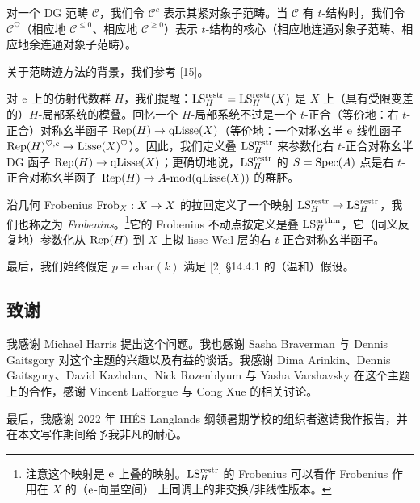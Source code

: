 对一个 DG 范畴 $\mathcal{C}$，我们令 $\mathcal{C}^c$ 表示其紧对象子范畴。当 $\mathcal{C}$ 有 $t$-结构时，我们令 $\mathcal{C}^\heartsuit$（相应地 $\mathcal{C}^{\leq 0}$、相应地 $\mathcal{C}^{\geq 0}$）表示 $t$-结构的核心（相应地连通对象子范畴、相应地余连通对象子范畴）。

关于范畴迹方法的背景，我们参考 [15]。

对 $\mathrm{e}$ 上的仿射代数群 $H$，我们提醒：$\mathrm{LS}^{\mathrm{restr}}_H = \mathrm{LS}^{\mathrm{restr}}_H(X)$ 是 $X$ 上（具有受限变差的）$H$-局部系统的模叠。回忆一个 $H$-局部系统不过是一个 $t$-正合（等价地：右 $t$-正合）对称幺半函子 $\mathrm{Rep}(H) \to \mathrm{qLisse}(X)$（等价地：一个对称幺半 $\mathrm{e}$-线性函子 $\mathrm{Rep}(H)^{\heartsuit,c} \to \mathrm{Lisse}(X)^{\heartsuit}$）。因此，我们定义叠 $\mathrm{LS}^{\mathrm{restr}}_H$ 来参数化右 $t$-正合对称幺半 DG 函子 $\mathrm{Rep}(H) \to \mathrm{qLisse}(X)$；更确切地说，$\mathrm{LS}^{\mathrm{restr}}_H$ 的 $S = \operatorname{Spec}(A)$ 点是右 $t$-正合对称幺半函子 $\mathrm{Rep}(H) \to A\text{-}\mathrm{mod}(\mathrm{qLisse}(X))$ 的群胚。

沿几何 Frobenius $\mathrm{Frob}_X: X \to X$ 的拉回定义了一个映射 $\mathrm{LS}^{\mathrm{restr}}_H \to \mathrm{LS}^{\mathrm{restr}}_H$，我们也称之为 \emph{Frobenius}。\footnote{注意这个映射是 $\mathrm{e}$ 上叠的映射。$\mathrm{LS}^{\mathrm{restr}}_H$ 的 Frobenius 可以看作 Frobenius 作用在 $X$ 的（$\mathrm{e}$-向量空间）\et{} 上同调上的非交换/非线性版本。}它的 Frobenius 不动点按定义是叠 $\mathrm{LS}^{\mathrm{arthm}}_H$，它（同义反复地）参数化从 $\mathrm{Rep}(H)$ 到 $X$ 上拟 lisse Weil 层的右 $t$-正合对称幺半函子。

最后，我们始终假定 $p = \mathrm{char}(k)$ 满足 [2] §14.4.1 的（温和）假设。

\subsection{致谢}

我感谢 Michael Harris 提出这个问题。我也感谢 Sasha Braverman 与 Dennis Gaitsgory 对这个主题的兴趣以及有益的谈话。我感谢 Dima Arinkin、Dennis Gaitsgory、David Kazhdan、Nick Rozenblyum 与 Yasha Varshavsky 在这个主题上的合作，感谢 Vincent Lafforgue 与 Cong Xue 的相关讨论。

最后，我感谢 2022 年 IHÉS Langlands 纲领暑期学校的组织者邀请我作报告，并在本文写作期间给予我非凡的耐心。
